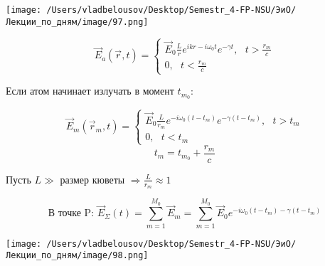 \documentclass[12pt, a4paper]{report}
\begin{document}
\begin{center}
    \texttt{[image: /Users/vladbelousov/Desktop/Semestr\_4-FP-NSU/ЭиО/Лекции\_по\_дням/image/97.png]}
\end{center} 
\[ \vec{E } _a (\vec{r }   ,t ) = \begin{cases}
\displaystyle \vec{E } _0 \frac{L}{r} e^{i k r - i \omega_0 t } e^{- \gamma t } , \text{ }  t> \frac{r_m}{c}  \\
0 , \text{ }  t < \frac{r_m} {c}   
\end{cases} \] 

Если атом начинает излучать в момент \( t_{m_0}       \): 

\[ \vec{E } _{m }  (\vec{r}  _m , t ) = \begin{cases}
\vec{E }_0 \frac{L}{r_m } e^{ - i \omega_0(t - t_m )} e^{- \gamma (t- t_m )} , \text{ } t>t_m\\
0 , \text{ } t<t_m    
\end{cases} \] 
\[ t_m = t_{ m_0} + \frac{ r_m }{c}   \] 

Пусть \( L\gg  \) размер кюветы \(\displaystyle  \Rightarrow \frac{L }{r_m } \approx 1   \)

\[ \text{В точке P: } \vec{E }  _{\Sigma } (t ) = \sum_{m =1} ^{M_0 }\vec{E } _m   = \sum_{m =1}^{M_0 } \vec{E } _0 e^{- i \omega_0 (t -t_m )- \gamma(t - t_m)}      \] 

\begin{center}
    \texttt{[image: /Users/vladbelousov/Desktop/Semestr\_4-FP-NSU/ЭиО/Лекции\_по\_дням/image/98.png]}
\end{center} 




\ifdefined\mainfile
\else
    
\end{document}
